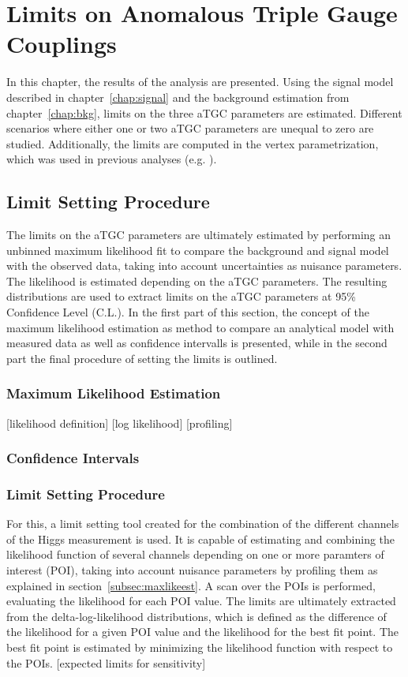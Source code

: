 \chapter{Limits on Anomalous Triple Gauge Couplings}
\label{chap:LimitsonATGCs}


In this chapter, the results of the analysis are presented. Using the signal model described in chapter~\ref{chap:signal} and the background estimation from chapter~\ref{chap:bkg}, limits on the three aTGC parameters are estimated. Different scenarios where either one or two aTGC parameters are unequal to zero are studied. Additionally, the limits are computed in the vertex parametrization, which was used in previous analyses (e.g. \cite{aTGC1,aTGC2}).


\section{Limit Setting Procedure}
The limits on the aTGC parameters are ultimately estimated by performing an unbinned maximum likelihood fit to compare the background and signal model with the observed data, taking into account uncertainties as nuisance parameters. The likelihood is estimated depending on the aTGC parameters. The resulting distributions are used to extract limits on the aTGC parameters at 95\% Confidence Level (C.L.). In the first part of this section, the concept of the maximum likelihood estimation as method to compare an analytical model with measured data as well as confidence intervalls is presented, while in the second part the final procedure of setting the limits is outlined.
\subsection{Maximum Likelihood Estimation}
[likelihood definition]
[log likelihood]
[profiling]
\subsection{Confidence Intervals}
\subsection{Limit Setting Procedure}

For this, a limit setting tool \cite{combine} created for the combination of the different channels of the Higgs measurement \cite{higgs_comb} is used. It is capable of estimating and combining the likelihood function of several channels depending on one or more paramters of interest (POI), taking into account nuisance parameters by profiling them as explained in section~\ref{subsec:maxlikeest}. A scan over the POIs is performed, evaluating the likelihood for each POI value.
The limits are ultimately extracted from the delta-log-likelihood distributions, which is defined as the difference of the likelihood for a given POI value and the likelihood for the best fit point. The best fit point is estimated by minimizing the likelihood function with respect to the POIs. 
[expected limits for sensitivity]

